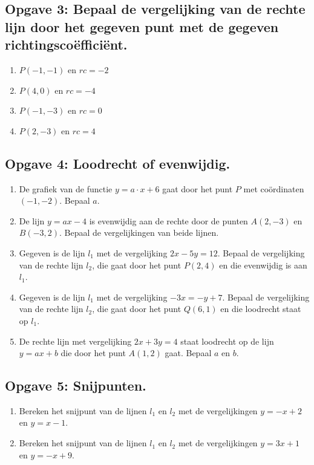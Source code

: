 \subsection*{Opgave 3: Bepaal de vergelijking van de rechte lijn door het gegeven punt met de gegeven richtingsco\"effici\"ent.}
\begin{enumerate}
\item[a.] $P(-1,-1)$ en $rc = -2$ \\
\item[b.] $P(4,0)$ en $rc = -4$ \\
\item[c.] $P(-1,-3)$ en $rc = 0$ \\
\item[d.] $P(2,-3)$ en $rc = 4$ \\
\end{enumerate}

\subsection*{Opgave 4: Loodrecht of evenwijdig.}
\begin{enumerate}
\item[a.] De grafiek van de functie $y = a \cdot x + 6$ gaat door het punt $P$ met co\"ordinaten $(-1,-2)$. Bepaal $a$. \\

\item[b.] De lijn $y = ax - 4$ is evenwijdig aan de rechte door de punten $A(2,-3)$ en $B(-3,2)$. Bepaal de vergelijkingen van beide lijnen. \\

\item[c.] Gegeven is de lijn $l_1$ met de vergelijking $2x - 5y = 12$. Bepaal de vergelijking van de rechte lijn $l_2$, die gaat door het punt $P(2,4)$ en die evenwijdig is aan $l_1$. \\

\item[d.] Gegeven is de lijn $l_1$ met de vergelijking $-3x = -y + 7$. Bepaal de vergelijking van de rechte lijn $l_2$, die gaat door het punt $Q(6,1)$ en die loodrecht staat op $l_1$. \\

\item[e.] De rechte lijn met vergelijking $2x + 3y = 4$ staat loodrecht op de lijn $y = ax + b$ die door het punt $A(1,2)$ gaat. Bepaal $a$ en $b$. \\
\end{enumerate}

\subsection*{Opgave 5: Snijpunten.}
\begin{enumerate}
\item[a.] Bereken het snijpunt van de lijnen $l_1$ en $l_2$ met de vergelijkingen $y = -x + 2$ en $y = x - 1$. \\
\item[b.] Bereken het snijpunt van de lijnen $l_1$ en $l_2$ met de vergelijkingen $y = 3x + 1$ en $y = -x + 9$. \\
\end{enumerate}